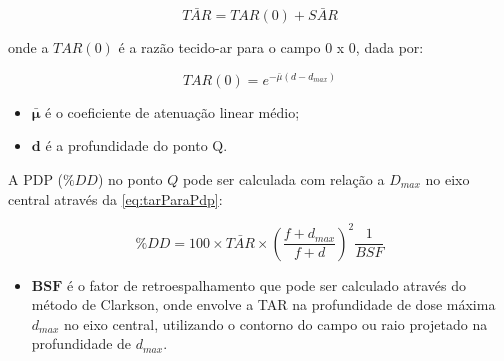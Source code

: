 \documentclass[11pt,a4paper]{article}
\newcounter{exemplo}
\begin{document}
		\begin{equation}
			\bar{TAR} = TAR(0) + \bar{SAR}
		\end{equation}

	onde a $TAR(0)$ é a razão tecido-ar para o campo 0 x 0, dada por:

		$$TAR(0) = e^{-\bar{\mu} (d - d_{max})}$$

	\begin{exemplo}[onde:]
		\begin{itemize}
			\item \textcolor{CarnationPink}{$\mathbf{\bar{\mu}}$} é o coeficiente de atenuação linear médio;
			\item \textcolor{CarnationPink}{$\mathbf{d}$} é a profundidade do ponto Q.
		\end{itemize}
	\end{exemplo}

	A PDP ($\%DD$) no ponto $Q$ pode ser calculada com relação a $D_{max}$ no eixo central através da \ref{eq:tarParaPdp}:

		\begin{equation}
			\%DD = 100 \times \bar{TAR} \times \left(\frac{f + d_{max}}{f + d}\right)^2 \frac{1}{BSF}
		\end{equation}

	\begin{exemplo}[onde:]
		\begin{itemize}
			\item \textcolor{CarnationPink}{$\mathbf{BSF}$} é o fator de retroespalhamento que pode ser calculado através do método de Clarkson, onde envolve a TAR na profundidade de dose máxima $d_{max}$ no eixo central, utilizando o contorno do campo ou raio projetado na profundidade de $d_{max}$.
		\end{itemize}
	\end{exemplo}
\end{document}
